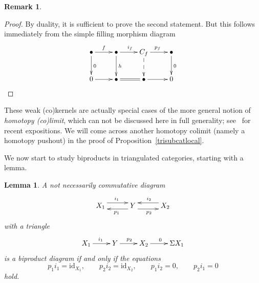 \documentclass{amsproc}
\newtheorem{lem}[prop]{Lemma}
\theoremstyle{definition}
\newtheorem{rem}[prop]{Remark}
\begin{document}
\begin{rem}
\begin{proof}
By duality, it is sufficient to prove the second statement. But this follows immediately from the simple filling morphism diagram
\begin{displaymath}
\xymatrix{{\bullet}\ar[r]^f\ar[d]^0 & {\bullet}\ar[r]^{i_f}\ar[d]^h & C_f\ar[r]^{p_f}\ar@{-->}[d] & {\bullet}\ar[d]^0\\
0\ar[r] & {\bullet}\ar@{=}[r] & {\bullet}\ar[r] & 0}
\end{displaymath}
\end{proof}

These weak (co)kernels are actually special cases of the more general notion of \emph{homotopy (co)limit}, which can not be discussed here in full generality; see~\cite{Dugger,Riehl} for recent expositions. We will come across another homotopy colimit (namely a homotopy pushout) in the proof of Proposition~\ref{trisubcatlocal}.
\end{rem}

We now start to study biproducts in triangulated categories, starting with a lemma.

\begin{lem}
\label{triangulatedbiproduct}
A not necessarily commutative diagram
\begin{displaymath}
\xymatrix@+5pt{X_1\ar@<1ex>[r]^{i_1} & Y\ar@<1ex>[l]^{p_1}\ar@<-1ex>[r]_{p_2} & X_2\ar@<-1ex>[l]_{i_2}}
\end{displaymath}
with a triangle
\begin{displaymath}
\xymatrix{X_1\ar[r]^{i_1} & Y\ar[r]^{p_2} & X_2\ar[r]^0 & {\Sigma X_1}}
\end{displaymath}
is a biproduct diagram if and only if the equations
\begin{displaymath}
p_1i_1={\mathrm{id}}_{X_1},\qquad p_2i_2={\mathrm{id}}_{X_2},\qquad p_1i_2=0,\qquad p_2i_1=0
\end{displaymath}
hold.
\end{lem}
\end{document}
